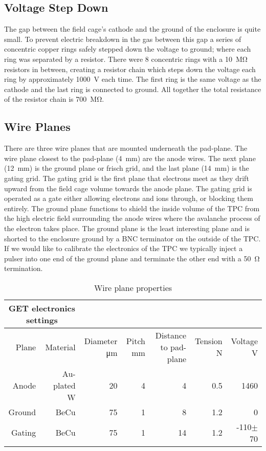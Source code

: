 \subsection{Voltage Step Down}
The gap between the field cage's cathode and the ground of the enclosure is quite small. To prevent electric breakdown in the gas between this gap a series of concentric copper rings safely stepped down the voltage to ground; where each ring was separated by a resistor. There were 8 concentric rings with a \SI{10}{\mega\ohm} resistors in between, creating a resistor chain which steps down the voltage each ring by approximately \SI{1000}{\volt} each time. The first ring is the same voltage as the cathode and the last ring is connected to ground. All together the total resistance of the resistor chain is \SI{700}{\mega\ohm}.


\subsection{Wire Planes}

There are three wire planes that are mounted underneath the pad-plane. The wire plane closest to the pad-plane (\SI{4}{\milli\metre}) are the anode wires. The next plane (\SI{12}{\milli\metre}) is the ground plane or frisch grid, and the last plane (\SI{14}{\milli\metre}) is the gating grid. The gating grid is the first plane that electrons meet as they drift upward from the field cage volume towards the anode plane. The gating grid is operated as a gate either allowing electrons and ions through, or blocking them entirely. The ground plane functions to shield the inside volume of the TPC from the high electric field surrounding the anode wires where the avalanche process of the electron takes place. The ground plane is the least interesting plane and is shorted to the enclosure ground by a BNC terminator on the outside of the TPC. If we would like to calibrate the electronics of the TPC we typically inject a pulser into one end of the ground plane and terminate the other end with a \SI{50}{\ohm} termination.  


 \begin{table*}[!htb]
 \centering
{}
\begin{tabular}{@{}rrrrrrr@{}}\toprule 
\multicolumn{2}{c}{GET electronics settings}\\
\midrule
 Plane & Material & Diameter \si{\micro\metre} & Pitch \si{\milli\metre} & Distance to pad-plane & Tension \si{\newton} & Voltage \si{\volt}\\ [0.5ex] 
 Anode  & Au-plated W   &  20  &  4  &  4   &  0.5  &  1460  \\
 Ground & BeCu          &  75  &  1  &  8   &  1.2  &  0     \\ 
 Gating & BeCu          &  75  &  1  &  14   &  1.2 &  -110$\pm$ 70\\ 
 \bottomrule
\end{tabular}
\caption{Wire plane properties}
\label{tb:wireplane}
\end{table*}

